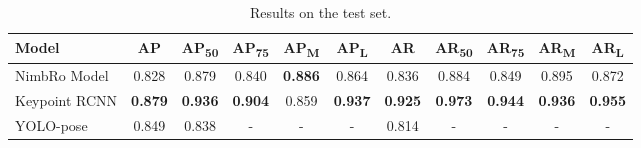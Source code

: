 \begin{longtable}{|L{1.5cm}|c|c|c|c|c|c|c|c|c|c|}
  \caption{Results on the test set.}
  \label{tb:result-on-test-set}\\
  \hline
  \textbf{Model} & \textbf{AP} & \textbf{AP\textsubscript{50}} & \textbf{AP\textsubscript{75}} & \textbf{AP\textsubscript{M}} & \textbf{AP\textsubscript{L}} & \textbf{AR} & \textbf{AR\textsubscript{50}} & \textbf{AR\textsubscript{75}} & \textbf{AR\textsubscript{M}} & \textbf{AR\textsubscript{L}} \\
  \hline
  NimbRo Model & 0.828       & 0.879                         & 0.840                         & \textbf{0.886}                       & 0.864                        & 0.836       & 0.884                         & 0.849                         & 0.895                        & 0.872 \\
  \hline                        
  Keypoint RCNN  & \textbf{0.879}       & \textbf{0.936}                         & \textbf{0.904}                         & 0.859                        & \textbf{0.937}                       & \textbf{0.925}       & \textbf{0.973}                         & \textbf{0.944}                         & \textbf{0.936}                        & \textbf{0.955} \\
  \hline                        
  YOLO-pose      & 0.849       & 0.838                         & -                             & -                            & -                            & 0.814       & -                             & -                             & -                            & - \\
  \hline
\end{longtable}


